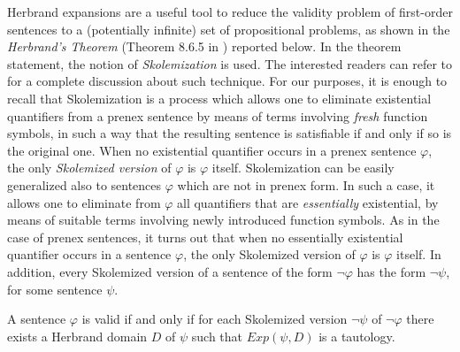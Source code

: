 \documentclass[manyauthors]{fundam}
\newcommand{\HExp}{Exp}
\begin{document}
Herbrand expansions are a useful tool to reduce the validity
problem of first-order sentences to a (potentially infinite) set of
propositional problems, as shown in the \emph{Herbrand's Theorem}
(Theorem 8.6.5 in \cite{Fitting96}) reported below.
In the theorem statement, the notion of \emph{Skolemization} is
used. The interested readers can refer to \cite{NonWei2001}
for a complete discussion about such technique.
For our purposes, it is enough to recall that Skolemization is
a process which allows one to eliminate existential quantifiers from 
a prenex sentence by means of terms involving \emph{fresh} function 
symbols, in such a way that the resulting sentence is satisfiable if 
and only if so is the
original one. When no existential quantifier occurs in a prenex 
sentence $\varphi$, the only \emph{Skolemized version} of $\varphi$ is
$\varphi$ itself. Skolemization can be easily generalized also to 
sentences $\varphi$ which are not in prenex form. In such a case, it 
allows one to eliminate from $\varphi$ all quantifiers that are 
\emph{essentially} existential, by means of suitable terms involving 
newly introduced function symbols. As in the case of prenex 
sentences, it turns out that
when no essentially existential quantifier occurs in a sentence 
$\varphi$, the only Skolemized version of $\varphi$ is $\varphi$ 
itself. In addition, every Skolemized version of a sentence of the 
form $\neg \varphi$ has the form $\neg \psi$, for some sentence 
$\psi$.


\begin{theorem}\label{HERVAL}
A sentence $\varphi$ is valid if and only if for each Skolemized 
version $\neg \psi$ of $\neg \varphi$ there exists a Herbrand domain 
$D$ of $\psi$ such that $\HExp(\psi, D)$ is a tautology. %
\end{theorem}
\end{document}
